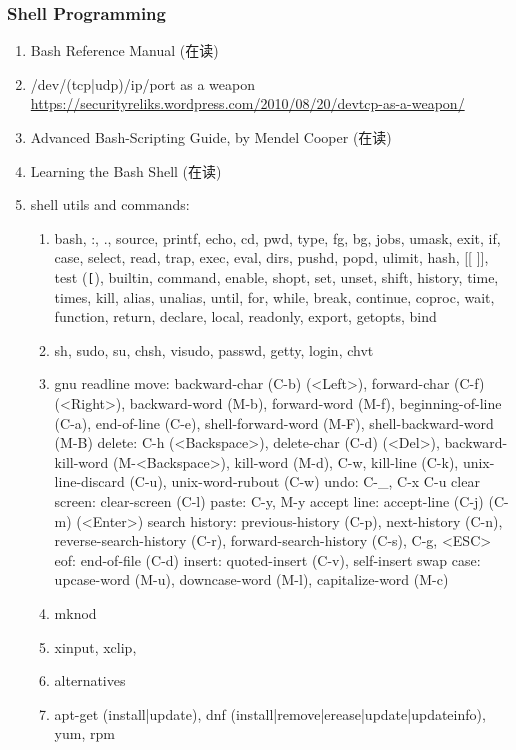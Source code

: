 \documentclass{article}
\begin{document}
\subsubsection{Shell Programming}
%
\begin{enumerate}
    \item Bash Reference Manual (在读)
    \item /dev/(tcp|udp)/ip/port as a weapon \url{https://securityreliks.wordpress.com/2010/08/20/devtcp-as-a-weapon/}
    \item Advanced Bash-Scripting Guide, by Mendel Cooper (在读)
    \item Learning the Bash Shell (在读)
    \item shell utils and commands:
        \begin{enumerate}
            \item bash, :, ., source, printf, echo, cd, pwd, type, fg, bg, jobs, umask, exit, if, case, select, read, trap, exec, eval, dirs, pushd, popd, ulimit, hash, [[ ]], test (\verb|[|), builtin, command, enable, shopt, set, unset, shift, history, time, times, kill, alias, unalias, until, for, while, break, continue, coproc, wait, function, return, declare, local, readonly, export, getopts, bind
            \item sh, sudo, su, chsh, visudo, passwd, getty, login, chvt
            \item gnu readline
                move: backward-char (C-b) (<Left>), forward-char (C-f) (<Right>), backward-word (M-b), forward-word (M-f), beginning-of-line (C-a), end-of-line (C-e), shell-forward-word (M-F), shell-backward-word (M-B)
                delete: C-h (<Backspace>), delete-char (C-d) (<Del>), backward-kill-word (M-<Backspace>), kill-word (M-d), C-w, kill-line (C-k), unix-line-discard (C-u), unix-word-rubout (C-w)
                undo: C-_, C-x C-u
                clear screen: clear-screen (C-l)
                paste: C-y, M-y
                accept line: accept-line (C-j) (C-m) (<Enter>)
                search history: previous-history (C-p), next-history (C-n), reverse-search-history (C-r), forward-search-history (C-s), C-g, <ESC>
                eof: end-of-file (C-d)
                insert: quoted-insert (C-v), self-insert
                swap case: upcase-word (M-u), downcase-word (M-l), capitalize-word (M-c)
            \item mknod
            \item xinput, xclip,
            \item alternatives
            \item apt-get (install|update), dnf (install|remove|erease|update|updateinfo), yum, rpm

\end{enumerate}
\end{enumerate}
\end{document}
